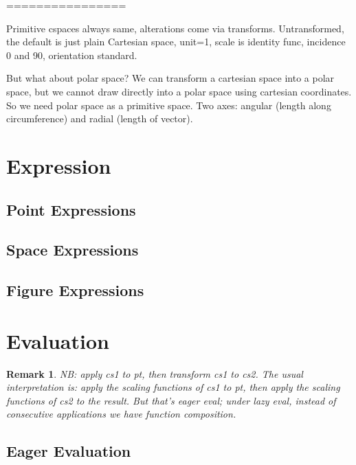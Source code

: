 \documentclass{tufte-handout}
\numberwithin{equation}{subsection}
\newtheorem{remark}{Remark}
\begin{document}
================


Primitive cspaces always same, alterations come via transforms.
Untransformed, the default is just plain Cartesian space, unit=1,
scale is identity func, incidence 0 and 90, orientation standard.

But what about polar space?  We can transform a cartesian space into a
polar space, but we cannot draw directly into a polar space using
cartesian coordinates.  So we need polar space as a primitive space.
Two axes: angular (length along circumference) and radial (length of
vector).

\section{Expression}
\label{sec:expr}

\subsection{Point Expressions}
\label{subs:pointexprs}

\subsection{Space Expressions}
\label{subs:spaceexprs}

\subsection{Figure Expressions}
\label{subs:figexprs}


\section{Evaluation}
\label{sec:eval}

\begin{remark}
  NB: apply cs1 to pt, then transform cs1 to cs2.  The usual
  interpretation is: apply the scaling functions of cs1 to pt, then
  apply the scaling functions of cs2 to the result.  But that's eager
  eval; under lazy eval, instead of consecutive applications we have
  function composition.
\end{remark}

\subsection{Eager Evaluation}
\label{subs:eager}
\end{document}
